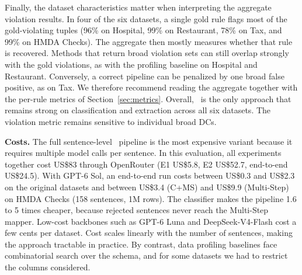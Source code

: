 Finally, the dataset characteristics matter when interpreting the aggregate
violation results. In four of the six datasets, a single gold rule flags most of
the gold-violating tuples (96\% on Hospital, 99\% on Restaurant, 78\% on Tax, and
99\% on HMDA Checks). The aggregate then mostly measures whether that rule is
recovered. Methods that return broad violation sets can still overlap strongly
with the gold violations, as with the profiling baseline on Hospital and
Restaurant. Conversely, a correct pipeline can be penalized by one broad false
positive, as on Tax. We therefore recommend reading the aggregate together with
the per-rule metrics of Section~\ref{sec:metrics}.
Overall, \system\ is the only approach that remains strong on classification and extraction across all six datasets. The violation metric remains sensitive to individual broad DCs.

\smallskip\noindent\textbf{Costs.}
The full sentence-level \system\ pipeline is the most expensive variant because it requires multiple model calls per sentence. In this evaluation, all experiments together cost US\$83 through OpenRouter (E1 US\$5.8, E2 US\$52.7, end-to-end US\$24.5). With GPT-6 Sol, an end-to-end run costs between US\$0.3 and US\$2.3 on the original datasets and between US\$3.4 (C+MS) and US\$9.9 (Multi-Step) on HMDA Checks (158 sentences, 1M rows). The classifier makes the pipeline 1.6 to 5 times cheaper, because rejected sentences never reach the Multi-Step mapper. Low-cost backbones such as GPT-6 Luna and DeepSeek-V4-Flash cost a few cents per dataset. Cost scales linearly with the number of sentences, making the approach tractable in practice. By contrast, data profiling baselines face combinatorial search over the schema, and for some datasets we had to restrict the columns considered.
